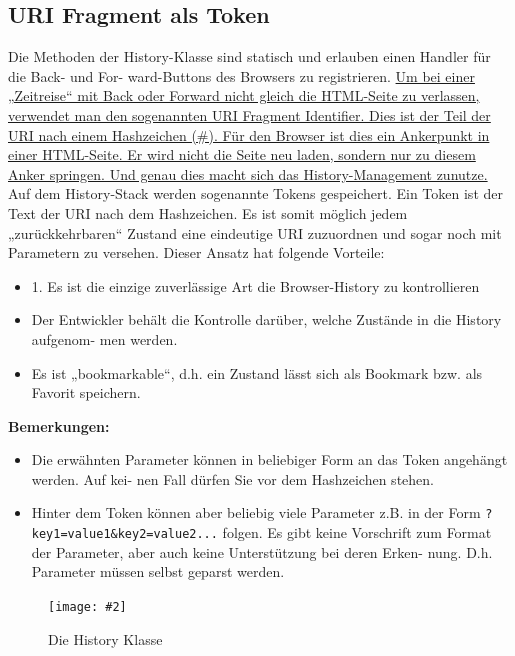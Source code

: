 \documentclass[a4paper,10pt]{scrreprt}
\newcommand{\pic}[2][figure]{\begin{figure}[h]
 \centering
 \texttt{[image: \#2]}
 \caption{#1}
\end{figure}
}
\begin{document}
\subsection{URI Fragment als Token}
Die Methoden der History-Klasse sind statisch und erlauben einen Handler für die Back- und For-
ward-Buttons des Browsers zu registrieren. \underline{Um bei einer „Zeitreise“ mit Back oder Forward nicht
gleich die HTML-Seite zu verlassen, verwendet man den sogenannten URI Fragment Identifier.
Dies ist der Teil der URI nach einem Hashzeichen (\#). Für den Browser ist dies ein Ankerpunkt in
einer HTML-Seite. Er wird nicht die Seite neu laden, sondern nur zu diesem Anker springen. Und
genau dies macht sich das History-Management zunutze.}
Auf dem History-Stack werden sogenannte Tokens gespeichert. Ein Token ist der Text der URI
nach dem Hashzeichen. Es ist somit möglich jedem „zurückkehrbaren“ Zustand eine eindeutige
URI zuzuordnen und sogar noch mit Parametern zu versehen. Dieser Ansatz hat folgende Vorteile:
\begin{itemize}
 \item 1. Es ist die einzige zuverlässige Art die Browser-History zu kontrollieren
\item Der Entwickler behält die Kontrolle darüber, welche Zustände in die History aufgenom-
men werden.
\item Es ist „bookmarkable“, d.h. ein Zustand lässt sich als Bookmark bzw. als Favorit speichern.
\end{itemize}

\textbf{Bemerkungen:}
\begin{itemize}
 \item Die erwähnten Parameter können in beliebiger Form an das Token angehängt werden. Auf kei-
nen Fall dürfen Sie vor dem Hashzeichen stehen.
\item Hinter dem Token können
aber beliebig viele Parameter z.B. in der Form \texttt{?key1=value1\&key2=value2...} folgen. Es
gibt keine Vorschrift zum Format der Parameter, aber auch keine Unterstützung bei deren Erken-
nung. D.h. Parameter müssen selbst geparst werden.
\end{itemize}
\pic[Die History Klasse]{hc.png}
\end{document}
